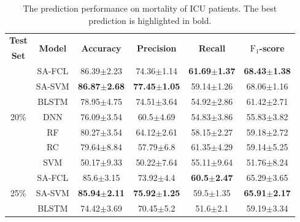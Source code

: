 \begin{table}
    \centering
    \scriptsize
    \caption{The prediction performance on mortality of ICU patients. The best prediction is highlighted in bold.}\label{tab: experimetal results on ICU patients}
    \begin{tabular}{c c cccc}
        \toprule
        {\bfseries Test} & \multirow{2}{*}{{\bfseries Model}} & \multirow{2}{*}{{\bfseries Accuracy}} & \multirow{2}{*}{{\bfseries Precision}} & \multirow{2}{*}{{\bfseries Recall}} & \multirow{2}{*}{{\bfseries $\text{F}_1$-score}}  \\ {\bfseries Set} & & & & & \\
        \midrule
    \multirow{7}{*}{20\%}  
    & SA-FCL & \multicolumn{1}{c}{86.39$\pm$2.23} & \multicolumn{1}{c}{74.36$\pm$1.14} & \multicolumn{1}{c}{{\bfseries 61.69$\pm$1.37}} & {\bfseries 68.43$\pm$1.38}\\
    & SA-SVM & \multicolumn{1}{c}{{\bfseries 86.87$\pm$2.68}} & \multicolumn{1}{c}{\bfseries 77.45$\pm$1.05} & \multicolumn{1}{c}{59.14$\pm$1.26} & {68.06$\pm$1.16}\\
    & BLSTM & \multicolumn{1}{c}{78.95$\pm$4.75} & \multicolumn{1}{c}{74.51$\pm$3.64} & \multicolumn{1}{c}{54.92$\pm$2.86} & 61.42$\pm$2.71\\
    & DNN & \multicolumn{1}{c}{76.09$\pm$3.54} & \multicolumn{1}{c}{60.5$\pm$4.69} & \multicolumn{1}{c}{54.83$\pm$3.86} & 55.83$\pm$3.82\\
    & RF & \multicolumn{1}{c}{80.27$\pm$3.54} & \multicolumn{1}{c}{64.12$\pm$2.61} & \multicolumn{1}{c}{58.15$\pm$2.27} & 59.18$\pm$2.72\\
    & RC & \multicolumn{1}{c}{79.64$\pm$8.84} & \multicolumn{1}{c}{57.79$\pm$6.8} & \multicolumn{1}{c}{61.35$\pm$4.29} & 59.14$\pm$5.25\\
    & SVM & \multicolumn{1}{c}{50.17$\pm$9.33} & \multicolumn{1}{c}{50.22$\pm$7.64} & \multicolumn{1}{c}{55.11$\pm$9.64} & 51.76$\pm$8.24\\
    \midrule
    \multirow{7}{*}{25\%}
    & SA-FCL & \multicolumn{1}{c}{85.6$\pm$3.15} & \multicolumn{1}{c}{73.92$\pm$4.4} & \multicolumn{1}{c}{{\bfseries 60.5$\pm$2.47}} & {65.29$\pm$3.65}\\
    & SA-SVM & \multicolumn{1}{c}{{\bfseries 85.94$\pm$2.11}} & \multicolumn{1}{c}{{\bfseries 75.92$\pm$1.25}} & \multicolumn{1}{c}{59.5$\pm$1.35} & {\bfseries 65.91$\pm$2.17}\\
    & BLSTM & \multicolumn{1}{c}{74.42$\pm$3.69} & \multicolumn{1}{c}{70.45$\pm$5.2} & \multicolumn{1}{c}{51.6$\pm$2.1} & 59.19$\pm$3.34\\

\end{tabular}
\end{table}
